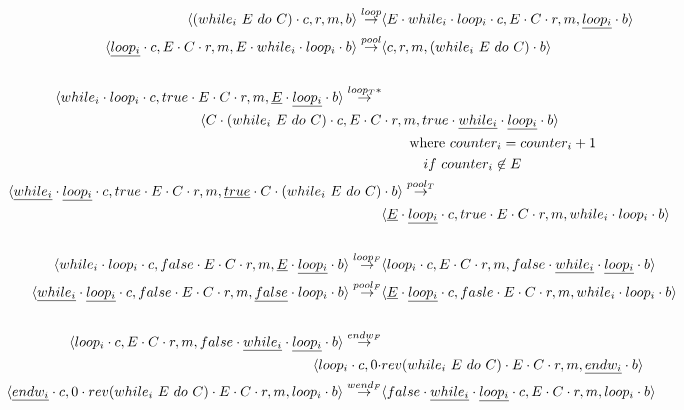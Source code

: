 \begin{figure}[ht]
    \centering
    \footnotesize
    \begin{align*}
    \astate{(while_i\ E\ do\ C)}{}{}{} 
    \arule{loop}& 
    \astate{E \cdot while_i \cdot loop_i}{E \cdot C}{}{\underline{loop_i}} \\
    \bstate{\underline{loop_i}}{E \cdot C}{}{E \cdot while_i \cdot loop_i} \arule{pool}&
    \bstate{}{}{}{(while_i\ E\ do\ C)} \\
    \\
    \astate{while_i \cdot loop_i}{true \cdot E \cdot C}{}{\underline{E} \cdot \underline{loop_i}} 
    \arule{loop_T*}&\\
    \astate{C \cdot (while_i\ E\ do\ C)}{E \cdot C&}{}{true \cdot \underline{while_i} \cdot \underline{loop_i}} \\
    &\quad\quad \text{where } counter_i = counter_i + 1\\&\quad\quad\quad if\ counter_i \not\in E \\
    \bstate{\underline{while_i} \cdot \underline{loop_i}}{true \cdot E \cdot C}{}{\underline{true} \cdot C \cdot (while_i\ E\ do\ C)&}
    \arule{pool_T}\\&
    \bstate{\underline{E} \cdot \underline{loop_i}}{true \cdot E \cdot C}{}{while_i \cdot loop_i} \\
    \\
    \astate{while_i \cdot loop_i}{false \cdot E \cdot C}{}{\underline{E} \cdot \underline{loop_i}} 
    \arule{loop_F}&
    \astate{loop_i}{E \cdot C}{}{false \cdot \underline{while_i} \cdot \underline{loop_i}} \\
    \bstate{\underline{while_i} \cdot \underline{loop_i}}{false \cdot E \cdot C}{}{\underline{false} \cdot loop_i}
    \arule{pool_F}&
    \bstate{\underline{E} \cdot \underline{loop_i}}{fasle \cdot E \cdot C}{}{while_i \cdot loop_i}\\
    \\
    \astate{loop_i}{E \cdot C}{}{false \cdot \underline{while_i} \cdot \underline{loop_i}} 
    \arule{endw_F}\\
    \astate{loop_i}{0 \cdot &rev(while_i\ E\ do\ C) \cdot E \cdot C}{}{\underline{endw_i}} \\
    \bstate{\underline{endw_i}}{0 \cdot rev(while_i\ E\ do\ C) \cdot E \cdot C}{}{loop_i}
    \arule{wend_F}&
    \bstate{false \cdot \underline{while_i} \cdot \underline{loop_i}}{E \cdot C}{}{loop_i} \\
    \\

\end{align*}
\end{figure}
